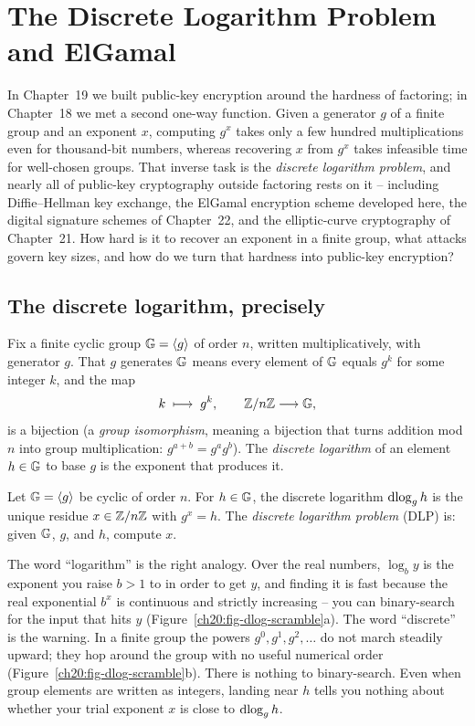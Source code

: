 \chapter{The Discrete Logarithm Problem and ElGamal}

In Chapter~19 we built public-key encryption around the hardness of factoring; in Chapter~18 we met a second one-way function. Given a generator $g$ of a finite group and an exponent $x$, computing $g^x$ takes only a few hundred multiplications even for thousand-bit numbers, whereas recovering $x$ from $g^x$ takes infeasible time for well-chosen groups. That inverse task is the \emph{discrete logarithm problem}, and nearly all of public-key cryptography outside factoring rests on it -- including Diffie--Hellman key exchange, the ElGamal encryption scheme developed here, the digital signature schemes of Chapter~22, and the elliptic-curve cryptography of Chapter~21. How hard is it to recover an exponent in a finite group, what attacks govern key sizes, and how do we turn that hardness into public-key encryption?

\chapterline

\section{The discrete logarithm, precisely}
\label{ch20:dlp}

Fix a finite cyclic group $\mathbb{G} = \langle g \rangle$ of order $n$, written multiplicatively, with generator $g$. That $g$
generates $\mathbb{G}$ means every element of $\mathbb{G}$ equals $g^k$ for some integer $k$, and the map
\[
  k \;\longmapsto\; g^k, \qquad \mathbb{Z}/n\mathbb{Z} \longrightarrow \mathbb{G},
\]
is a bijection (a \emph{group isomorphism}, meaning a bijection that turns addition mod $n$ into group multiplication: $g^{a+b}=g^a g^b$). The \emph{discrete
logarithm} of an element $h \in \mathbb{G}$ to base $g$ is the exponent that produces it.

\begin{definition}
\label{ch20:def-dlog}
Let $\mathbb{G} = \langle g \rangle$ be cyclic of order $n$. For $h \in \mathbb{G}$, the discrete logarithm
$\operatorname{dlog}_g h$ is the unique residue $x \in \mathbb{Z}/n\mathbb{Z}$ with $g^x = h$. The \emph{discrete logarithm
problem} (DLP) is: given $\mathbb{G}$, $g$, and $h$, compute $x$.
\end{definition}

The word ``logarithm'' is the right analogy. Over the real numbers, $\log_b y$ is the
exponent you raise $b > 1$ to in order to get $y$, and finding it is fast because the real exponential $b^x$ is continuous
and strictly increasing -- you can binary-search for the input that hits $y$ (Figure~\ref{ch20:fig-dlog-scramble}a). The word ``discrete'' is the warning. In a finite group
the powers $g^0, g^1, g^2, \dots$ do not march steadily upward; they hop around the group with no
useful numerical order (Figure~\ref{ch20:fig-dlog-scramble}b). There is nothing to binary-search. Even when group elements are written as integers, landing near $h$ tells you nothing about whether your trial exponent $x$ is close to $\operatorname{dlog}_g h$.

